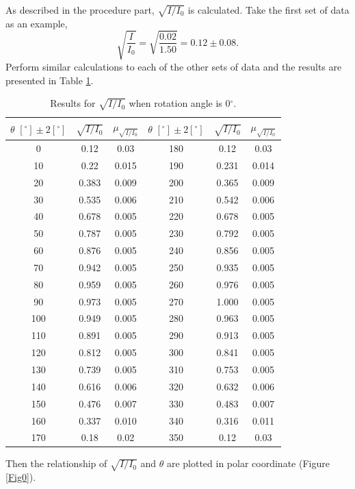 \documentclass{article}
\begin{document}
As described in the procedure part, $\sqrt{I/I_0}$ is calculated. Take the first set of data as an example,
$$\sqrt{\frac{I}{I_0}} = \sqrt{\frac{0.02}{1.50}} = 0.12 \pm 0.08.$$
Perform similar calculations to each of the other sets of data and the results are presented in Table \ref{TableSqrt}.

\begin{table}[H]\centering
\begin{tabular}{ccc||ccc}
\toprule
$\theta\,\,[^\circ] \pm 2[^\circ]$ & $\sqrt{I/I_0}$ & $\mu_{\sqrt{I/I_0}}$ & $\theta\,\,[^\circ] \pm 2[^\circ]$ & $\sqrt{I/I_0}$ & $\mu_{\sqrt{I/I_0}}$ \\
\midrule
0 & 0.12 & 0.03 & 180 & 0.12 & 0.03 \\
10 & 0.22 & 0.015 & 190 & 0.231 & 0.014 \\
20 & 0.383 & 0.009 & 200 & 0.365 & 0.009 \\
30 & 0.535 & 0.006 & 210 & 0.542 & 0.006 \\
40 & 0.678 & 0.005 & 220 & 0.678 & 0.005 \\
50 & 0.787 & 0.005 & 230 & 0.792 & 0.005 \\
60 & 0.876 & 0.005 & 240 & 0.856 & 0.005 \\
70 & 0.942 & 0.005 & 250 & 0.935 & 0.005 \\
80 & 0.959 & 0.005 & 260 & 0.976 & 0.005 \\
90 & 0.973 & 0.005 & 270 & 1.000 & 0.005 \\
100 & 0.949 & 0.005 & 280 & 0.963 & 0.005 \\
110 & 0.891 & 0.005 & 290 & 0.913 & 0.005 \\
120 & 0.812 & 0.005 & 300 & 0.841 & 0.005 \\
130 & 0.739 & 0.005 & 310 & 0.753 & 0.005 \\
140 & 0.616 & 0.006 & 320 & 0.632 & 0.006 \\
150 & 0.476 & 0.007 & 330 & 0.483 & 0.007 \\
160 & 0.337 & 0.010 & 340 & 0.316 & 0.011 \\
170 & 0.18 & 0.02 & 350 & 0.12 & 0.03  \\
\bottomrule
\end{tabular}
\caption{Results for $\sqrt{I/I_0}$ when rotation angle is 0$^\circ$.}\label{TableSqrt}
\end{table}

Then the relationship of $\sqrt{I/I_0}$ and $\theta$ are plotted in polar coordinate (Figure \ref{Fig0}).
\end{document}
